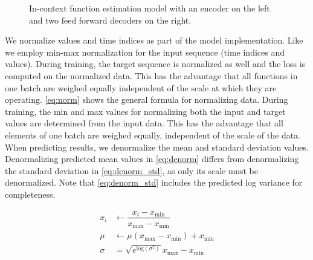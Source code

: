 \begin{figure}
	\centering
	\caption{In-context function estimation model with an encoder on the left and two feed forward decoders on the right.}
	\label{fig:model}
\end{figure}

We normalize values and time indices as part of the model implementation. Like \citet{seifner2025zeroshotimputationfoundationinference} we employ min-max normalization for the input sequence (time indices and values). During training, the target sequence is normalized as well and the loss is computed on the normalized data. This has the advantage that all functions in one batch are weighed equally independent of the scale at which they are operating. \autoref{eq:norm} shows the general formula for normalizing data. During training, the min and max values for normalizing both the input and target values are determined from the input data. This has the advantage that all elements of one batch are weighed equally, independent of the scale of the data. When predicting results, we denormalize the mean and standard deviation values. Denormalizing predicted mean values in \autoref{eq:denorm} differs from denormalizing the standard deviation in \autoref{eq:denorm_std}, as only its scale must be denormalized. Note that \autoref{eq:denorm_std} includes the predicted log variance for completeness.

\begin{align}
x_i &\leftarrow \dfrac{x_i-x_{\text{min}}}{x_{\text{max}}-x_{\text{min}}} \label{eq:norm} \\
\mu &\leftarrow \mu (x_{\text{max}}-x_{\text{min}}) + x_{\text{min}} \label{eq:denorm} \\
\sigma &= \sqrt{e^{\text{log}(\sigma^2)}} x_{\text{max}}-x_{\text{min}} \label{eq:denorm_std} 
\end{align}



